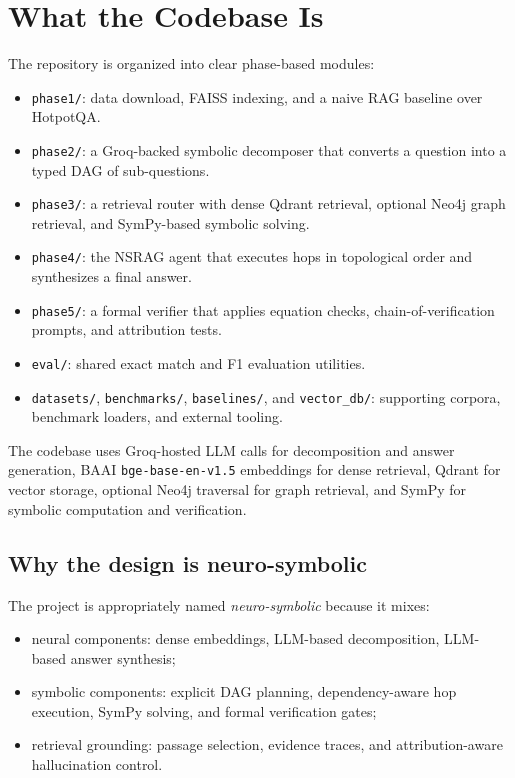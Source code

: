 \documentclass[11pt]{article}
\begin{document}
\section{What the Codebase Is}
The repository is organized into clear phase-based modules:

\begin{itemize}[leftmargin=1.2em]
\item \texttt{phase1/}: data download, FAISS indexing, and a naive RAG baseline over HotpotQA.
\item \texttt{phase2/}: a Groq-backed symbolic decomposer that converts a question into a typed DAG of sub-questions.
\item \texttt{phase3/}: a retrieval router with dense Qdrant retrieval, optional Neo4j graph retrieval, and SymPy-based symbolic solving.
\item \texttt{phase4/}: the NSRAG agent that executes hops in topological order and synthesizes a final answer.
\item \texttt{phase5/}: a formal verifier that applies equation checks, chain-of-verification prompts, and attribution tests.
\item \texttt{eval/}: shared exact match and F1 evaluation utilities.
\item \texttt{datasets/}, \texttt{benchmarks/}, \texttt{baselines/}, and \texttt{vector\_db/}: supporting corpora, benchmark loaders, and external tooling.
\end{itemize}

The codebase uses Groq-hosted LLM calls for decomposition and answer generation, BAAI \texttt{bge-base-en-v1.5} embeddings for dense retrieval, Qdrant for vector storage, optional Neo4j traversal for graph retrieval, and SymPy for symbolic computation and verification.

\subsection*{Why the design is neuro-symbolic}
The project is appropriately named \textit{neuro-symbolic} because it mixes:

\begin{itemize}[leftmargin=1.2em]
\item neural components: dense embeddings, LLM-based decomposition, LLM-based answer synthesis;
\item symbolic components: explicit DAG planning, dependency-aware hop execution, SymPy solving, and formal verification gates;
\item retrieval grounding: passage selection, evidence traces, and attribution-aware hallucination control.
\end{itemize}
\end{document}
